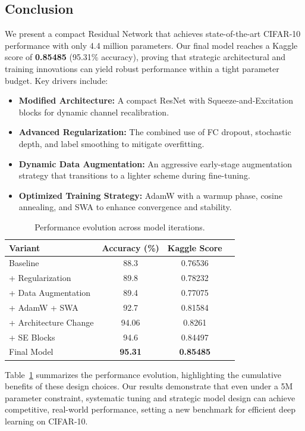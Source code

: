 \documentclass[letterpaper]{article}
\begin{document}
\subsection{Conclusion}
We present a compact Residual Network that achieves state-of-the-art CIFAR‑10 performance with only 4.4 million parameters. Our final model reaches a Kaggle score of \textbf{0.85485} (95.31\% accuracy), proving that strategic architectural and training innovations can yield robust performance within a tight parameter budget. Key drivers include:
\begin{itemize} 
    \item \textbf{Modified Architecture:} A compact ResNet with Squeeze-and-Excitation blocks for dynamic channel recalibration.
    \item \textbf{Advanced Regularization:} The combined use of FC dropout, stochastic depth, and label smoothing to mitigate overfitting.
    \item \textbf{Dynamic Data Augmentation:} An aggressive early-stage augmentation strategy that transitions to a lighter scheme during fine-tuning.
    \item \textbf{Optimized Training Strategy:} AdamW with a warmup phase, cosine annealing, and SWA to enhance convergence and stability.
\end{itemize}
\begin{table}[h]
\centering
\begin{tabular}{lccc}
\hline
\textbf{Variant} & \textbf{Accuracy (\%)} & \textbf{Kaggle Score} \\
\hline
Baseline  & 88.3 & 0.76536 \\
+ Regularization &  89.8 & 0.78232 \\
+ Data Augmentation  & 89.4 & 0.77075 \\
+ AdamW + SWA  & 92.7 & 0.81584 \\
+ Architecture Change & 94.06 & 0.8261\\
+ SE Blocks &  94.6 & 0.84497 \\
Final Model & \textbf{95.31} & \textbf{0.85485} \\
\hline
\end{tabular}
\caption{Performance evolution across model iterations.}
\label{tab:results_summary}
\end{table}
Table~\ref{tab:results_summary} summarizes the performance evolution, highlighting the cumulative benefits of these design choices. Our results demonstrate that even under a 5M parameter constraint, systematic tuning and strategic model design can achieve competitive, real-world performance, setting a new benchmark for efficient deep learning on CIFAR‑10.


\end{document}
